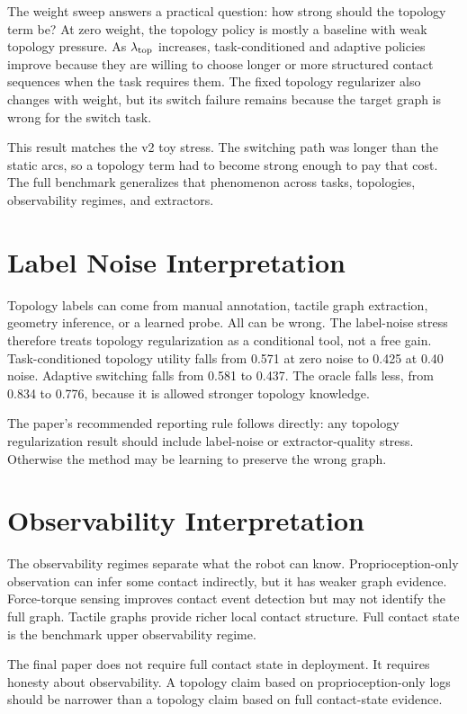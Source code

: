 \documentclass{article}
\begin{document}
The weight sweep answers a practical question: how strong should the topology term be? At zero weight, the topology policy is mostly a baseline with weak topology pressure. As $\lambda_{\rm top}$ increases, task-conditioned and adaptive policies improve because they are willing to choose longer or more structured contact sequences when the task requires them. The fixed topology regularizer also changes with weight, but its switch failure remains because the target graph is wrong for the switch task.

This result matches the v2 toy stress. The switching path was longer than the static arcs, so a topology term had to become strong enough to pay that cost. The full benchmark generalizes that phenomenon across tasks, topologies, observability regimes, and extractors.

\section{Label Noise Interpretation}

Topology labels can come from manual annotation, tactile graph extraction, geometry inference, or a learned probe. All can be wrong. The label-noise stress therefore treats topology regularization as a conditional tool, not a free gain. Task-conditioned topology utility falls from 0.571 at zero noise to 0.425 at 0.40 noise. Adaptive switching falls from 0.581 to 0.437. The oracle falls less, from 0.834 to 0.776, because it is allowed stronger topology knowledge.

The paper's recommended reporting rule follows directly: any topology regularization result should include label-noise or extractor-quality stress. Otherwise the method may be learning to preserve the wrong graph.

\section{Observability Interpretation}

The observability regimes separate what the robot can know. Proprioception-only observation can infer some contact indirectly, but it has weaker graph evidence. Force-torque sensing improves contact event detection but may not identify the full graph. Tactile graphs provide richer local contact structure. Full contact state is the benchmark upper observability regime.

The final paper does not require full contact state in deployment. It requires honesty about observability. A topology claim based on proprioception-only logs should be narrower than a topology claim based on full contact-state evidence.
\end{document}
